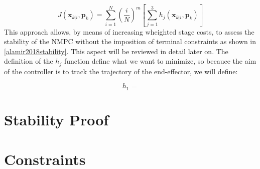 \begin{equation}
J(\textbf{x}_{k|i},\textbf{p}_k)=\sum_{i=1}^{N}\left(\frac{i}{N}\right)^m \left[ \sum_{j=1}^{3} h_j(\textbf{x}_{k|i},\textbf{p}_k) \right]
\end{equation} 
This approach allows, by means of increasing wheighted stage costs, to assess the stability of the NMPC without the imposition of terminal constraints as shown in \ref{alamir2018stability}. This aspect will be reviewed in detail later on.
The definition of the $h_j$ function define what we want to minimize, so becauce the aim of the controller is to track the trajectory of the end-effector, we will define: 

\begin{equation}
h_1 = %
\end{equation} 








\section{Stability Proof}\label{stabproof}


\section{Constraints}
